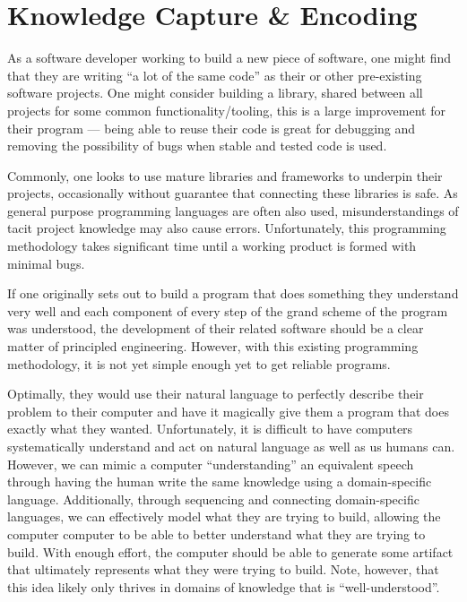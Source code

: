 \section{Knowledge Capture \& Encoding}


As a software developer working to build a new piece of software, one might
find that they are writing ``a lot of the same code'' as their or other
pre-existing software projects. One might consider building a library, shared
between all projects for some common functionality/tooling, this is a large
improvement for their program --- being able to reuse their code is great for
debugging and removing the possibility of bugs when stable and tested code is
used.


Commonly, one looks to use mature libraries and frameworks to underpin their
projects, occasionally without guarantee that connecting these libraries is safe.
As general purpose programming languages are often also used, misunderstandings
of tacit project knowledge may also cause errors. Unfortunately, this
programming methodology takes significant time until a working product is formed
with minimal bugs.

If one originally sets out to build a program that does something they
understand very well and each component of every step of the grand scheme of the
program was understood, the development of their related software should be a
clear matter of principled engineering. However, with this existing programming
methodology, it is not yet simple enough yet to get reliable programs.

Optimally, they would use their natural language to perfectly describe their
problem to their computer and have it magically give them a program that does
exactly what they wanted. Unfortunately, it is difficult to have computers
systematically understand and act on natural language as well as us humans can.
However, we can mimic a computer ``understanding'' an equivalent speech through
having the human write the same knowledge using a domain-specific language.
Additionally, through sequencing and connecting domain-specific languages, we
can effectively model what they are trying to build, allowing the computer
computer to be able to better understand what they are trying to build. With
enough effort, the computer should be able to generate some artifact that
ultimately represents what they were trying to build. Note, however, that this
idea likely only thrives in domains of knowledge that is
``well-understood''.


